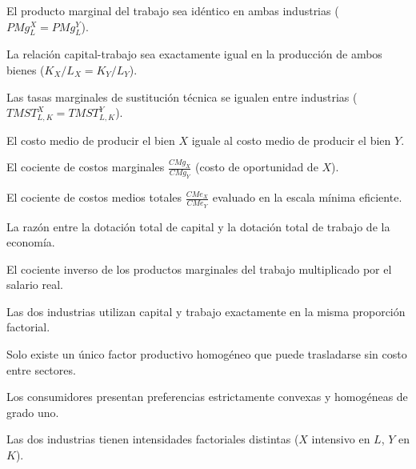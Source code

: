 \begin{opts}
    \item El producto marginal del trabajo sea idéntico en ambas industrias ($PMg_L^X = PMg_L^Y$).
    \item La relación capital-trabajo sea exactamente igual en la producción de ambos bienes ($K_X/L_X = K_Y/L_Y$).
    \item Las tasas marginales de sustitución técnica se igualen entre industrias ($TMST_{L,K}^X = TMST_{L,K}^Y$).
    \item El costo medio de producir el bien $X$ iguale al costo medio de producir el bien $Y$.
\end{opts}

\begin{opts}
    \item El cociente de costos marginales $\frac{CMg_X}{CMg_Y}$ (costo de oportunidad de $X$).
    \item El cociente de costos medios totales $\frac{CMe_X}{CMe_Y}$ evaluado en la escala mínima eficiente.
    \item La razón entre la dotación total de capital y la dotación total de trabajo de la economía.
    \item El cociente inverso de los productos marginales del trabajo multiplicado por el salario real.
\end{opts}

\begin{opts}
    \item Las dos industrias utilizan capital y trabajo exactamente en la misma proporción factorial.
    \item Solo existe un único factor productivo homogéneo que puede trasladarse sin costo entre sectores.
    \item Los consumidores presentan preferencias estrictamente convexas y homogéneas de grado uno.
    \item Las dos industrias tienen intensidades factoriales distintas ($X$ intensivo en $L$, $Y$ en $K$).
\end{opts}

